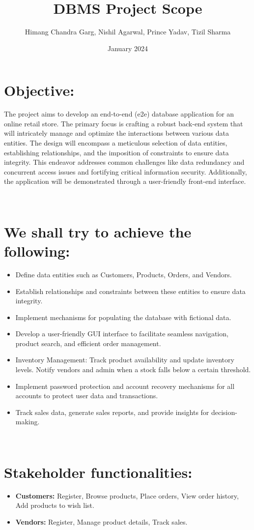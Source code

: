 \documentclass{article}
\title{\textbf{DBMS Project Scope}}
\author{Himang Chandra Garg, Nishil Agarwal, Prince Yadav, Tizil Sharma}
\date{January 2024}
\begin{document}
\maketitle

\section{Objective:}

The project aims to develop an end-to-end (e2e) database application for an online retail store. The primary focus is crafting a robust back-end system that will intricately manage and optimize the interactions between various data entities. The design will encompass a meticulous selection of data entities, establishing relationships, and the imposition of constraints to ensure data integrity. This endeavor addresses common challenges like data redundancy and concurrent access issues and fortifying critical information security. Additionally, the application will be demonstrated through a user-friendly front-end interface.

\
\section{We shall try to achieve the following:}
\begin{itemize}
\item Define data entities such as Customers, Products, Orders, and Vendors.

\item Establish relationships and constraints between these entities to ensure data integrity.

\item Implement mechanisms for populating the database with fictional data.

\item Develop a user-friendly GUI interface to facilitate seamless navigation, product search, and efficient order management.

\item Inventory Management: Track product availability and update inventory levels. Notify vendors and admin when a stock falls below a certain threshold.

\item Implement password protection and account recovery mechanisms for all accounts to protect user data and transactions.

\item Track sales data, generate sales reports, and provide insights for decision-making.
\end{itemize}
\
\section{Stakeholder functionalities:}
\begin{itemize}
\item \textbf{Customers:} Register, Browse products, Place orders, View order history, Add products to wish list.
\item \textbf{Vendors:} Register, Manage product details, Track sales.
\end{itemize}
\end{document}
